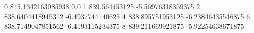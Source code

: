 0 845.1342163085938 0.0
1 839.564453125 -5.56976318359375
2 838.6404418945312 -6.4937744140625
4 838.895751953125 -6.23846435546875
6 838.7149047851562 -6.4193115234375
8 839.211669921875 -5.92254638671875
